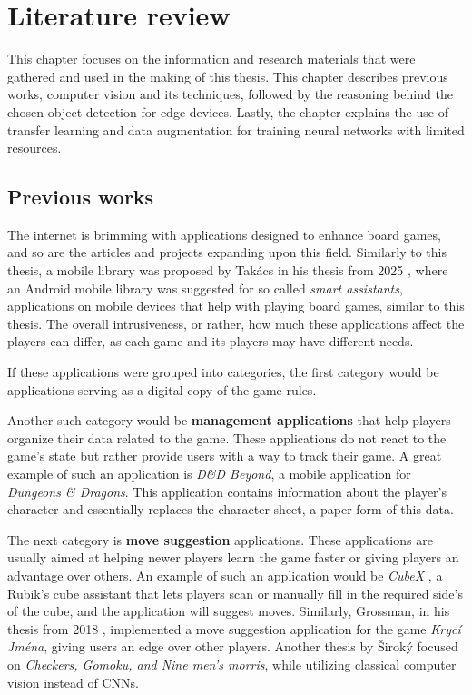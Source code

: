 

\chapter{Literature review}
This chapter focuses on the information and research materials that were gathered and used in the making of this thesis. This chapter describes previous works, computer vision and its techniques, followed by the reasoning behind the chosen object detection for edge devices. Lastly, the chapter explains the use of transfer learning and data augmentation for training neural networks with limited resources.

\section{Previous works}
The internet is brimming with applications designed to enhance board games, and so are the articles and projects expanding upon this field. Similarly to this thesis, a mobile library was proposed by Takács in his thesis from 2025 \cite{takacs}, where an Android mobile library was suggested for so called \textit{smart assistants}, applications on mobile devices that help with playing board games, similar to this thesis. The overall intrusiveness, or rather, how much these applications affect the players can differ, as each game and its players may have different needs.

If these applications were grouped into categories, the first category would be applications serving as a digital copy of the game rules.

Another such category would be \textbf{management applications} that help players organize their data related to the game. These applications do not react to the game's state but rather provide users with a way to track their game. A great example of such an application is \textit{D\&D Beyond}, a mobile application for \textit{Dungeons \& Dragons}. This application contains information about the player's character and essentially replaces the character sheet, a paper form of this data.

The next category is \textbf{move suggestion} applications. These applications are usually aimed at helping newer players learn the game faster or giving players an advantage over others. An example of such an application would be \textit{CubeX} , a Rubik's cube assistant that lets players scan or manually fill in the required side's of the cube, and the application will suggest moves. Similarly, Grossman, in his thesis from 2018 \cite{grossman}, implemented a move suggestion application for the game \textit{Krycí Jména}, giving users an edge over other players. Another thesis by Široký \cite{siroky} focused on \textit{Checkers, Gomoku, and Nine men’s morris}, while utilizing classical computer vision instead of CNNs.

